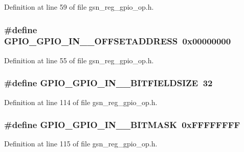 Definition at line 59 of file gsn\_\-reg\_\-gpio\_\-op.h.

\hypertarget{a00553_a2e767a84839acf27464ae4a3d6c10e04}{
\subsubsection[{GPIO\_\-GPIO\_\-IN\_\-0\_\-OFFSETADDRESS}]{\setlength{\rightskip}{0pt plus 5cm}\#define GPIO\_\-GPIO\_\-IN\_\_\-OFFSETADDRESS~0x00000000}}
\label{a00553_a2e767a84839acf27464ae4a3d6c10e04}


Definition at line 55 of file gsn\_\-reg\_\-gpio\_\-op.h.

\hypertarget{a00553_a3a6efa6b55e3e074b139f2f821869a4a}{
\subsubsection[{GPIO\_\-GPIO\_\-IN\_\-1\_\-BITFIELDSIZE}]{\setlength{\rightskip}{0pt plus 5cm}\#define GPIO\_\-GPIO\_\-IN\_\_\-BITFIELDSIZE~32}}
\label{a00553_a3a6efa6b55e3e074b139f2f821869a4a}


Definition at line 114 of file gsn\_\-reg\_\-gpio\_\-op.h.

\hypertarget{a00553_a0f355b00dfe232726a9096fedb31addb}{
\subsubsection[{GPIO\_\-GPIO\_\-IN\_\-1\_\-BITMASK}]{\setlength{\rightskip}{0pt plus 5cm}\#define GPIO\_\-GPIO\_\-IN\_\_\-BITMASK~0xFFFFFFFF}}
\label{a00553_a0f355b00dfe232726a9096fedb31addb}


Definition at line 115 of file gsn\_\-reg\_\-gpio\_\-op.h.

